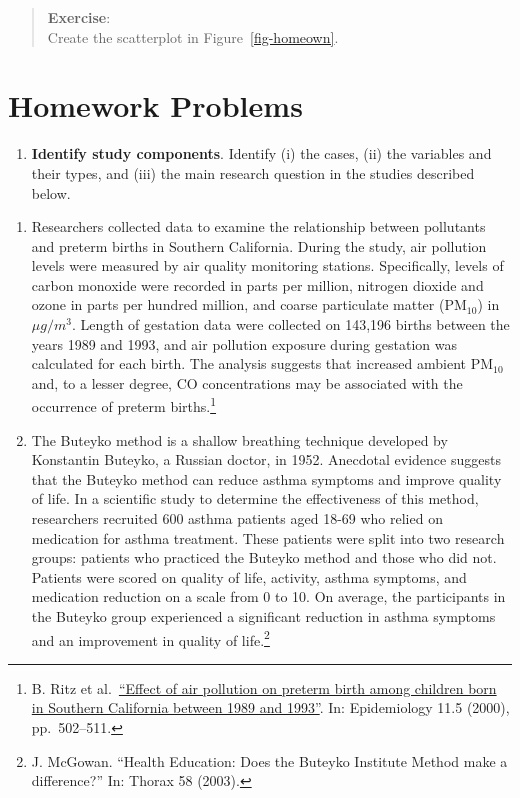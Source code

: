 \documentclass[
  letterpaper,
  DIV=11,
  numbers=noendperiod]{scrreprt}
\providecommand{\tightlist}{%
  \setlength{\itemsep}{0pt}\setlength{\parskip}{0pt}}\usepackage{longtable,booktabs,array}
\begin{document}
\begin{quote}
\textbf{Exercise}:\\
Create the scatterplot in Figure~\ref{fig-homeown}.
\end{quote}

\section{Homework Problems}\label{homework-problems-1}

\begin{enumerate}
\def\labelenumi{\arabic{enumi}.}
\tightlist
\item
  \textbf{Identify study components}. Identify (i) the cases, (ii) the
  variables and their types, and (iii) the main research question in the
  studies described below.
\end{enumerate}

\begin{enumerate}
\def\labelenumi{\alph{enumi}.}
\item
  Researchers collected data to examine the relationship between
  pollutants and preterm births in Southern California. During the
  study, air pollution levels were measured by air quality monitoring
  stations. Specifically, levels of carbon monoxide were recorded in
  parts per million, nitrogen dioxide and ozone in parts per hundred
  million, and coarse particulate matter (PM\(_{10}\)) in \(\mu g/m^3\).
  Length of gestation data were collected on 143,196 births between the
  years 1989 and 1993, and air pollution exposure during gestation was
  calculated for each birth. The analysis suggests that increased
  ambient PM\(_{10}\) and, to a lesser degree, CO concentrations may be
  associated with the occurrence of preterm births.\footnote{B. Ritz et
    al.~\href{http://journals.lww.com/epidem/Abstract/2000/09000/Effect_of_Air_Pollution_on_Preterm_Birth_Among.4.aspx}{``Effect
    of air pollution on preterm birth among children born in Southern
    California between 1989 and 1993''}. In: Epidemiology 11.5 (2000),
    pp.~502--511.}
\item
  The Buteyko method is a shallow breathing technique developed by
  Konstantin Buteyko, a Russian doctor, in 1952. Anecdotal evidence
  suggests that the Buteyko method can reduce asthma symptoms and
  improve quality of life. In a scientific study to determine the
  effectiveness of this method, researchers recruited 600 asthma
  patients aged 18-69 who relied on medication for asthma treatment.
  These patients were split into two research groups: patients who
  practiced the Buteyko method and those who did not. Patients were
  scored on quality of life, activity, asthma symptoms, and medication
  reduction on a scale from 0 to 10. On average, the participants in the
  Buteyko group experienced a significant reduction in asthma symptoms
  and an improvement in quality of life.\footnote{J. McGowan. ``Health
    Education: Does the Buteyko Institute Method make a difference?''
    In: Thorax 58 (2003).}
\end{enumerate}
\end{document}
